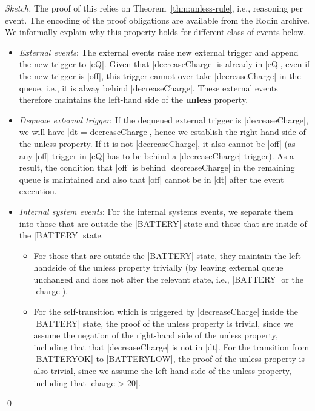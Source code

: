 \begin{proof}[Sketch]
 The proof of this relies on Theorem~\ref{thm:unless-rule}, i.e.,
 reasoning per event.  The encoding of the proof obligations are
 available from the Rodin archive. We informally explain why this
 property holds for different class of events below.
 \begin{itemize}
 \item \emph{External events}: The external events raise new external
   trigger and append the new trigger to |eQ|. Given that
   |decreaseCharge| is already in |eQ|, even if the new trigger is
   |off|, this trigger cannot over take |decreaseCharge| in the queue,
   i.e., it is alway behind |decreaseCharge|. These external events
   therefore maintains the left-hand side of the \textbf{unless} property.
   
 \item \emph{Dequeue external trigger}: If the dequeued external
   trigger is |decreaseCharge|, we will have |dt = {decreaseCharge}|,
   hence we establish the right-hand side of the unless property.
   If it is not |decreaseCharge|, it also cannot be |off| (as any
   |off| trigger in |eQ| has to be behind a |decreaseCharge|
   trigger). As a result, the condition that |off| is behind
   |decreaseCharge| in the remaining queue is maintained and also that
   |off| cannot be in |dt| after the event execution.
   
 \item \emph{Internal system events}: For the internal systems events,
   we separate them into those that are outside the |BATTERY| state
   and those that are inside of the |BATTERY| state.
   \begin{itemize}
   \item For those that are outside the |BATTERY| state, they maintain
     the left handside of the unless property trivially (by leaving
     external queue unchanged and does not alter the relevant state,
     i.e., |BATTERY| or the |charge|).
     
   \item For the self-transition which is triggered by
     |decreaseCharge| inside the |BATTERY| state, the proof of the
     unless property is trivial, since we assume the negation of the
     right-hand side of the unless property, including that that
     |decreaseCharge| is not in |dt|. For the transition from
     |BATTERYOK| to |BATTERYLOW|, the proof of the unless property is
     also trivial, since we assume the left-hand side of the unless
     property, including that |charge > 20|.
   \end{itemize}
 \end{itemize}
 \qed
\end{proof}
